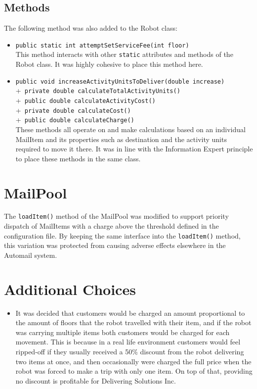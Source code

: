 \documentclass{article}
\begin{document}
\subsection{Methods}
The following method was also added to the Robot class:
\begin{itemize}
    \item \verb|public static int attemptSetServiceFee(int floor)|\\[2mm]
    This method interacts with other \verb|static| attributes and methods of the Robot class. It was highly cohesive to place this method here.
    \item \verb|public void increaseActivityUnitsToDeliver(double increase)|\\
    +\verb| private double calculateTotalActivityUnits()|\\
    +\verb| public double calculateActivityCost()|\\
    +\verb| private double calculateCost()|\\
    +\verb| public double calculateCharge()|\\[2mm]
    These methods all operate on and make calculations based on an individual MailItem and its properties such as destination and the activity units required to move it there. It was in line with the Information Expert principle to place these methods in the same class.
\end{itemize}

\section{MailPool}
The \verb|loadItem()| method of the MailPool was modified to support priority dispatch of MailItems with a charge above the threshold defined in the configuration file. By keeping the same interface into the \verb|loadItem()| method, this variation was protected from causing adverse effects elsewhere in the Automail system.

\section{Additional Choices}
\begin{itemize}
    \item It was decided that customers would be charged an amount proportional to the amount of floors that the robot travelled with their item, and if the robot was carrying multiple items both customers would be charged for each movement. This is because in a real life environment customers would feel ripped-off if they usually received a 50\% discount from the robot delivering two items at once, and then occasionally were charged the full price when the robot was forced to make a trip with only one item. On top of that, providing no discount is profitable for Delivering Solutions Inc.
\end{itemize}
\end{document}
